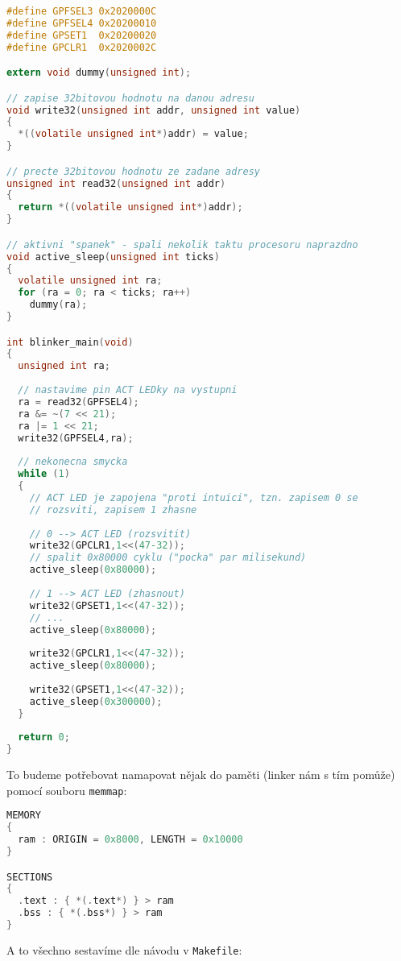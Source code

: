 \documentclass{article}
\begin{document}
\begin{lstlisting}[language=C]
#define GPFSEL3 0x2020000C
#define GPFSEL4 0x20200010
#define GPSET1  0x20200020
#define GPCLR1  0x2020002C

extern void dummy(unsigned int);

// zapise 32bitovou hodnotu na danou adresu
void write32(unsigned int addr, unsigned int value)
{
  *((volatile unsigned int*)addr) = value;
}

// precte 32bitovou hodnotu ze zadane adresy
unsigned int read32(unsigned int addr)
{
  return *((volatile unsigned int*)addr);
}

// aktivni "spanek" - spali nekolik taktu procesoru naprazdno
void active_sleep(unsigned int ticks)
{
  volatile unsigned int ra;
  for (ra = 0; ra < ticks; ra++)
    dummy(ra);
}

int blinker_main(void)
{
  unsigned int ra;
	
  // nastavime pin ACT LEDky na vystupni
  ra = read32(GPFSEL4);
  ra &= ~(7 << 21);
  ra |= 1 << 21;
  write32(GPFSEL4,ra);
	
  // nekonecna smycka
  while (1)
  {
    // ACT LED je zapojena "proti intuici", tzn. zapisem 0 se
    // rozsviti, zapisem 1 zhasne
		
    // 0 --> ACT LED (rozsvitit)
    write32(GPCLR1,1<<(47-32));
    // spalit 0x80000 cyklu ("pocka" par milisekund)
    active_sleep(0x80000);
		
    // 1 --> ACT LED (zhasnout)
    write32(GPSET1,1<<(47-32));
    // ...
    active_sleep(0x80000);
		
    write32(GPCLR1,1<<(47-32));
    active_sleep(0x80000);
		
    write32(GPSET1,1<<(47-32));
    active_sleep(0x300000);
  }
	
  return 0;
}
\end{lstlisting}

To budeme potřebovat namapovat nějak do paměti (linker nám s tím pomůže) pomocí souboru \texttt{memmap}:

\begin{lstlisting}[language=C]
MEMORY
{
  ram : ORIGIN = 0x8000, LENGTH = 0x10000
}

SECTIONS
{
  .text : { *(.text*) } > ram
  .bss : { *(.bss*) } > ram
}
\end{lstlisting}

A to všechno sestavíme dle návodu v \texttt{Makefile}:
\end{document}
